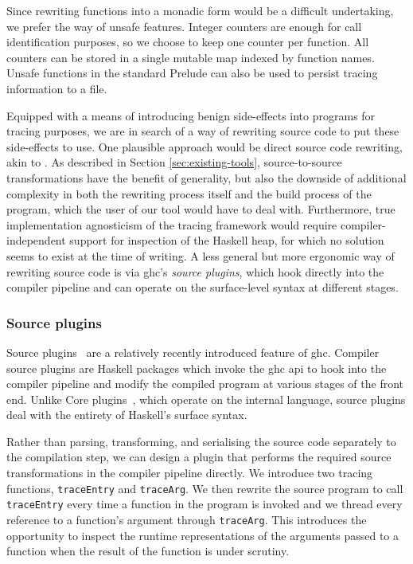 \documentclass[thesis=B,english]{FITthesis}[2019/12/23]
\newcommand{\hsIdent}[1]{\texttt{#1}}
\begin{document}
Since rewriting functions into a monadic form would be a difficult undertaking,
we prefer the way of unsafe features. Integer counters are enough for call
identification purposes, so we choose to keep one counter per function. All
counters can be stored in a single mutable map indexed by function names.
Unsafe functions in the standard Prelude can also be used to persist tracing
information to a file.

Equipped with a means of introducing benign side-effects into programs for
tracing purposes, we are in search of a way of rewriting source code to put
these side-effects to use. One plausible approach would be direct source code
rewriting, akin to . As described in Section
\ref{sec:existing-tools}, source-to-source transformations have the benefit of
generality, but also the downside of additional complexity in both the
rewriting process itself and the build process of the program, which the user
of our tool would have to deal with. Furthermore, true implementation
agnosticism of the tracing framework would require compiler-independent support
for inspection of the Haskell heap, for which no solution seems to exist at the
time of writing. A less general but more ergonomic way of rewriting source code
is via \acrshort{ghc}'s \textit{source plugins}, which hook directly into the
compiler pipeline and can operate on the surface-level syntax at different
stages.

\subsubsection*{Source plugins}
Source plugins~\cite{ghc-source-plugins} are a relatively recently introduced
feature of \acrshort{ghc}. Compiler source plugins are Haskell packages which
invoke the \acrshort{ghc} \acrshort{api} to hook into the compiler pipeline and
modify the compiled program at various stages of the front end. Unlike Core
plugins~\cite{ghc-compiler-plugins}, which operate on the internal language,
source plugins deal with the entirety of Haskell's surface syntax.

Rather than parsing, transforming, and serialising the source code separately
to the compilation step, we can design a plugin that performs the required
source transformations in the compiler pipeline directly. We introduce two
tracing functions, \hsIdent{traceEntry} and \hsIdent{traceArg}. We then rewrite
the source program to call \hsIdent{traceEntry} every time a function in the
program is invoked and we thread every reference to a function's argument
through \hsIdent{traceArg}. This introduces the opportunity to inspect the
runtime representations of the arguments passed to a function when the result
of the function is under scrutiny.
\end{document}

